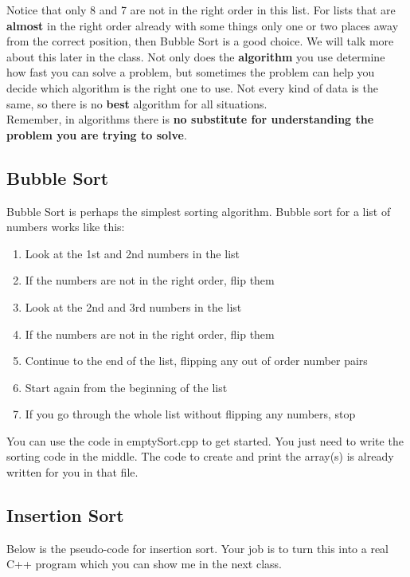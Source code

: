 \documentclass[a4paper,12pt]{article} %
\begin{document}
\noindent
Notice that only 8 and 7 are not in the right order in this list. For lists that are \textbf{almost} in the right order already with some things only one or two places away from the correct position, then Bubble Sort is a good choice. We will talk more about this later in the class. Not only does the \textbf{algorithm} you use determine how fast you can solve a problem, but sometimes the problem can help you decide which algorithm is the right one to use. Not every kind of data is the same, so there is no \textbf{best} algorithm for all situations.\\ 

\noindent
Remember, in algorithms there is \textbf{no substitute for understanding the problem you are trying to solve}. 

\subsection{Bubble Sort}

Bubble Sort is perhaps the simplest sorting algorithm. Bubble sort for a list of numbers works like this:

\begin{enumerate}
\item Look at the 1st and 2nd numbers in the list
\item If the numbers are not in the right order, flip them
\item Look at the 2nd and 3rd numbers in the list
\item If the numbers are not in the right order, flip them
\item Continue to the end of the list, flipping any out of order number pairs
\item Start again from the beginning of the list
\item If you go through the whole list without flipping any numbers, stop
\end{enumerate}

\noindent
You can use the code in emptySort.cpp to get started. You just need to write the sorting code in the middle. The code to create and print the array(s) is already written for you in that file. 

\subsection{Insertion Sort}

Below is the pseudo-code for insertion sort. Your job is to turn this into a real C++ program which you can show me in the next class. 
\end{document}
